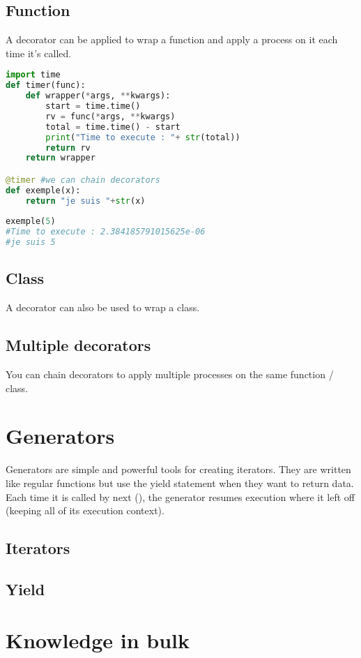\documentclass[a4paper, 12pt]{article}
\begin{document}
\subsection{Function}
A decorator can be applied to wrap a function and apply a process on it each time it's called.
\begin{lstlisting}[language=Python]
import time
def timer(func):
	def wrapper(*args, **kwargs):
		start = time.time()
		rv = func(*args, **kwargs)
		total = time.time() - start
		print("Time to execute : "+ str(total))
		return rv
	return wrapper

@timer #we can chain decorators
def exemple(x):
	return "je suis "+str(x)
	
exemple(5)
#Time to execute : 2.384185791015625e-06
#je suis 5
\end{lstlisting}

\subsection{Class}
A decorator can also be used to wrap a class.

\subsection{Multiple decorators}
You can chain decorators to apply multiple processes on the same function / class.

\newpage
\section{Generators}
\label{sec:Generators}
Generators are simple and powerful tools for creating iterators. They are written like regular functions but use the yield statement when they want to return data. Each time it is called by next (), the generator resumes execution where it left off (keeping all of its execution context).\newline
\subsection{Iterators}
\subsection{Yield}

\newpage
\section{Knowledge in bulk}
\end{document}
